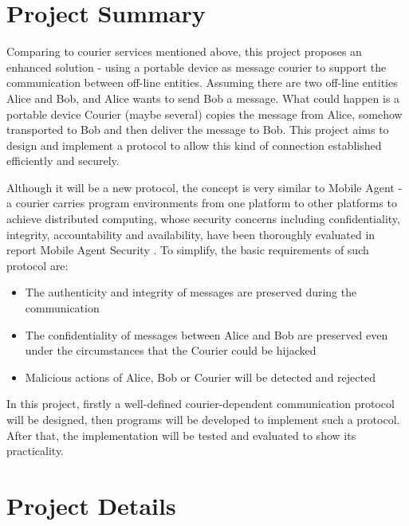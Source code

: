 \documentclass[11pt,a4paper]{article}
\begin{document}
\section{Project Summary}
Comparing to courier services mentioned above, this project proposes an enhanced solution - using a portable device as message courier to support the communication between off-line entities. Assuming there are two off-line entities Alice and Bob, and Alice wants to send Bob a message. What could happen is a portable device Courier (maybe several) copies the message from Alice, somehow transported to Bob and then deliver the message to Bob. This project aims to design and implement a protocol to allow this kind of connection established efficiently and securely.\par 
Although it will be a new protocol, the concept is very similar to Mobile Agent - a courier carries program environments from one platform to other platforms to achieve distributed computing, whose security concerns including confidentiality, integrity, accountability and availability, have been thoroughly evaluated in report Mobile Agent Security \cite{wayne}. To simplify, the basic requirements of such protocol are:
\begin{itemize}
\item The authenticity and integrity of messages are preserved during the communication
\item The confidentiality of messages between Alice and Bob are preserved even under the circumstances that the Courier could be hijacked
\item Malicious actions of Alice, Bob or Courier will be detected and rejected
\end{itemize}
\par
In this project, firstly a well-defined courier-dependent communication protocol will be designed, then programs will be developed to implement such a protocol. After that, the implementation will be tested and evaluated to show its practicality.

\section{Project Details}
\end{document}

